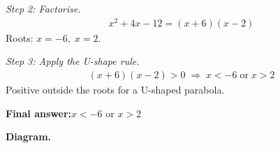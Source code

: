 \documentclass[11pt]{article}
\begin{document}
\textit{Step 2: Factorise.}
\[\begin{gathered}
x^2 + 4x - 12 = (x + 6)(x - 2)
\end{gathered}\]
Roots: \( x = -6, \; x = 2 \).

\textit{Step 3: Apply the U-shape rule.}
\[\begin{gathered}
(x + 6)(x - 2) > 0 \;\Longrightarrow\; x < -6 \;\text{or}\; x > 2
\end{gathered}\]
Positive outside the roots for a U-shaped parabola.

\begin{answerbox}
\textbf{Final answer:}\quad \(\displaystyle x < -6\) or \(\displaystyle x > 2\)
\end{answerbox}
\textbf{Diagram.}

\begin{center}
\end{center}
\end{document}
